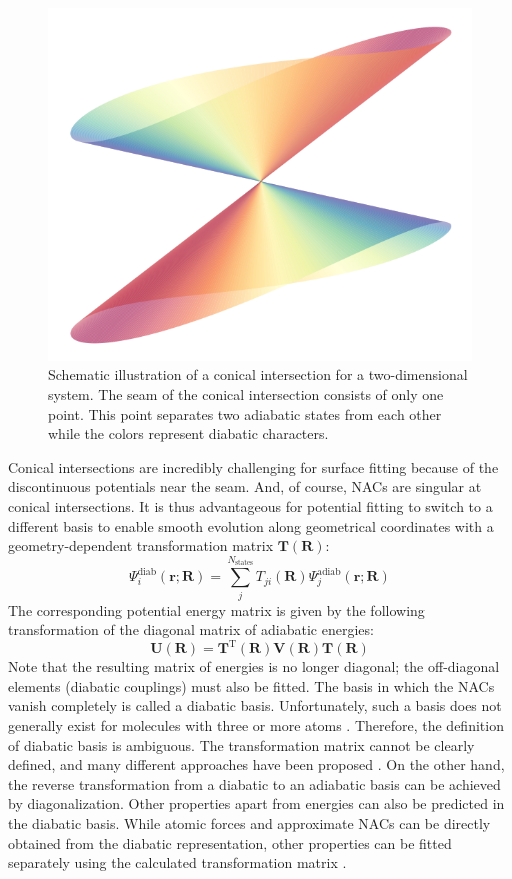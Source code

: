 \documentclass[9pt,bestpractices]{livecoms}
\begin{document}
\begin{figure}[hbt!]
\centering
\includegraphics[width=0.7\linewidth]{figures/CI.png}
\caption{Schematic illustration of a conical intersection for a two-dimensional system. The seam of the conical intersection consists of only one point. This point separates two adiabatic states from each other while the colors represent diabatic characters.}
\label{fig:CI}
\end{figure}
 
Conical intersections are incredibly challenging for surface fitting because of the discontinuous potentials near the seam. And, of course, NACs are singular at conical intersections. It is thus advantageous for potential fitting to switch to a different basis to enable smooth evolution along geometrical coordinates with a geometry-dependent transformation matrix $\mathbf{T}(\mathbf{R})$:
\begin{equation}
\Psi_i^\text{diab} (\mathbf{r};\mathbf{R}) = \sum_j^{N_\text{states}} T_{ji}(\mathbf{R}) \Psi_j^\text{adiab} (\mathbf{r};\mathbf{R})    
\end{equation}
The corresponding potential energy matrix is given by the following transformation of the diagonal matrix of adiabatic energies:
\begin{equation}
\mathbf{U}(\mathbf{R}) = \mathbf{T}^\text{T}(\mathbf{R}) \mathbf{V}(\mathbf{R})\mathbf{T}(\mathbf{R})    
\end{equation}
Note that the resulting matrix of energies is no longer diagonal; the off-diagonal elements (diabatic couplings) must also be fitted.
The basis in which the NACs vanish completely is called a diabatic basis. Unfortunately, such a basis does not generally exist for molecules with three or more atoms \cite{Mead1982ConditionsSystems}. Therefore, the definition of diabatic basis is ambiguous. The transformation matrix cannot be clearly defined, and many different approaches have been proposed \cite{RN26}. On the other hand, the reverse transformation from a diabatic to an adiabatic basis can be achieved by diagonalization. Other properties apart from energies can also be predicted in the diabatic basis. While atomic forces and approximate NACs can be directly obtained from the diabatic representation, other properties can be fitted separately using the calculated transformation matrix \cite{RN25, RN24}.
\end{document}
